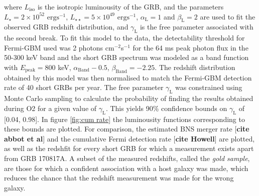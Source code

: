 \documentclass[11pt]{cuthesis}
\begin{document}
where $L_\text{iso}$ is the isotropic luminousity of the GRB, and the parameters $L_{\star} = 2 \times 10^{52} \text{ ergs}^{-1}$, $L_{\star\star}=5 \times 10^{49} \text{ ergs}^{-1}$, $\alpha_\text{L} = 1$ and $\beta_\text{L} = 2$ are used to fit the observed GRB redshift distribution, and $\gamma_\text{L}$ is the free parameter associated with the second break. To fit this model to the data, the detectability threshold for Fermi-GBM used was 2 photons cm$^{-2}$s$^{-1}$ for the 64 ms peak photon flux in the 50-300 keV band and the short GRB spectrum was modeled as a band function with $E_\text{peak}=800$ keV, $\alpha_\text{Band}-0.5$, $\beta_\text{Band} = -2.25$. The redshift distribution obtained by this model was then normalised to match the Fermi-GBM detection rate of 40 short GRBs per year. The free parameter $\gamma_\text{L}$ was constrained using Monte Carlo sampling to calculate the probability of finding the results obtained during O2 for a given value of $\gamma_\text{L}$. This yields 90\% confidence bounds on $\gamma_\text{L}$ of [0.04, 0.98]. In figure \ref{fig:cum rate} the luminousity functions corresponding to these bounds are plotted. For comparison, the estimated BNS merger rate [\textbf{cite abbot et al}] and the cumulative Fermi detection rate [\textbf{cite Howell}] are plotted, as well as the redshfit for every short GRB for which a measurement exists apart from GRB 170817A. A subset of the measured redshifts, called the \textit{gold sample}, are those for which a confident association with a host galaxy was made, which reduces the chance that the redshift measurement was made for the wrong galaxy.
\end{document}
